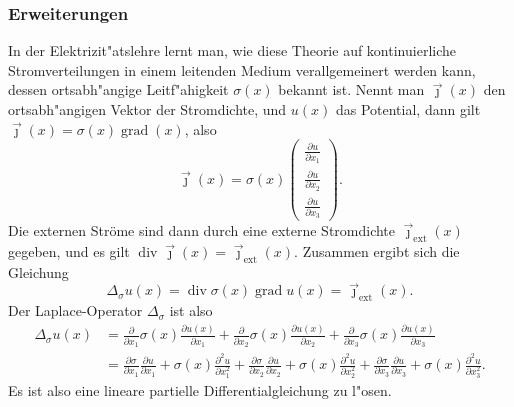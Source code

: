 \subsubsection{Erweiterungen}
In der Elektrizit"atslehre lernt man, wie diese Theorie auf kontinuierliche
Stromverteilungen in einem leitenden Medium verallgemeinert werden kann,
dessen ortsabh"angige Leitf"ahigkeit $\sigma(x)$ bekannt ist.
Nennt man $\vec\jmath(x)$ den ortsabh"angigen
Vektor der Stromdichte, und $u(x)$ das Potential, dann gilt
$\vec\jmath(x)=\sigma(x)\operatorname{grad}(x)$, also
\[
\vec\jmath(x)=\sigma(x)\begin{pmatrix}
\frac{\partial u}{\partial x_1}\\
\frac{\partial u}{\partial x_2}\\
\frac{\partial u}{\partial x_3}
\end{pmatrix}.
\]
Die externen Str\"ome sind dann durch eine externe Stromdichte
$\vec\jmath_{\text{ext}}(x)$ gegeben, und es gilt
$\operatorname{div}\vec\jmath(x)=\vec\jmath_{\text{ext}}(x)$. Zusammen ergibt
sich die Gleichung
\[
\Delta_{\sigma}u(x)=\operatorname{div}\sigma(x)\operatorname{grad} u(x)=\vec\jmath_{\text{ext}}(x).
\]
Der Laplace-Operator $\Delta_\sigma$ ist also
\begin{align*}
\Delta_\sigma u(x)&=
\frac{\partial}{\partial x_1}\sigma(x)\frac{\partial u(x)}{\partial x_1}
+
\frac{\partial}{\partial x_2}\sigma(x)\frac{\partial u(x)}{\partial x_2}
+
\frac{\partial}{\partial x_3}\sigma(x)\frac{\partial u(x)}{\partial x_3}
\\
&=
\frac{\partial\sigma}{\partial x_1}\frac{\partial u}{\partial x_1}
+\sigma(x)\frac{\partial^2 u}{\partial x_1^2}+
\frac{\partial\sigma}{\partial x_2}\frac{\partial u}{\partial x_2}
+\sigma(x)\frac{\partial^2 u}{\partial x_2^2}+
\frac{\partial\sigma}{\partial x_3}\frac{\partial u}{\partial x_3}
+\sigma(x)\frac{\partial^2 u}{\partial x_3^2}.
\end{align*}
Es ist also eine lineare partielle Differentialgleichung zu l"osen.

